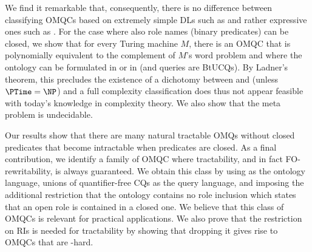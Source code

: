\documentclass{lmcs}
\theoremstyle{definition}
\begin{document}
We find it remarkable that, consequently, there is no difference
between classifying OMQCs based on extremely simple DLs such as
\dllitecore and rather expressive ones such as
\alchi. %
%
For the case where also role names (binary predicates) can be closed,
we show that for every \NP Turing machine $M$, there is an OMQC that
is polynomially equivalent to the complement of $M$'s word problem and
where the ontology can be formulated in \dllite or in \EL (and
queries are BtUCQs). By Ladner's theorem, this precludes the existence
of a dichotomy between \PTime and \conp (unless $\PTime=\NP$) and a
full complexity classification does thus not appear feasible with
today's knowledge in complexity theory. We also show that the meta
problem is undecidable.


Our results show that there are many natural tractable OMQs 
without closed predicates that become intractable when predicates are
closed. As a final contribution, we identify a family of OMQC where
tractability, and in fact FO-rewritability, is always guaranteed.  We
obtain this class by using \dlliter as the ontology language, unions
of quantifier-free CQs as the query language, and imposing the
additional restriction that the ontology contains no role inclusion
which states that an open role is contained in a closed one. We
believe that this class of OMQCs is relevant for practical
applications. We also prove that the restriction on RIs is needed for
tractability by showing that dropping it gives rise to OMQCs
that are \conp-hard.
\end{document}
